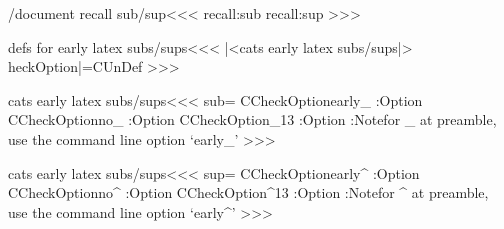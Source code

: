 {{{{{{{{\</document recall sub/sup\><<<
\csname recall:sub\endcsname   
\csname recall:sup\endcsname
>>>

\<defs for early latex subs/sups\><<<
\def\:CheckOption#1{\def\:temp{#1}%
   \:Optionfalse
   \expandafter\:ScanOptions\config:opt,,//}
\def\:ScanOptions#1,#2//{\def\:next{#1}%
   \ifx        \:next\empty
   \else \ifx  \:temp\:next   \:Optiontrue   \let\:next\relax
   \else \def\:next{\:ScanOptions#2//}%
   \fi  \fi  \:next }
|<cats early latex subs/sups|>
\let\:CheckOption|=\:UnDef
>>>



\<cats early latex subs/sups\><<<
\let\early:sub=\empty
\:CheckOption{early_} \if:Option
   \:CheckOption{no_} \if:Option  \else
      \:CheckOption{_13} \if:Option
           \def\early:sub{%
               \xdef\recall:sub{%
                  \mathcode`\noexpand\_=\the\mathcode`\_
                  \catcode`\noexpand\_=\the\catcode`\_
               }
              \mathcode`\_="8000 \catcode`\_=13 
          }
      \else
           \def\early:sub{%
               \xdef\recall:sub{%
                  \mathcode`\noexpand\_=\the\mathcode`\_
                  \catcode`\noexpand\_=\the\catcode`\_
               }%
              \mathcode`\_="8000 \catcode`\_=12 
          }
      \fi
   \fi
\else 
   \Log:Note{for \string_ at preamble, 
          use the command line option `early\string_'}%
\fi
>>>

\<cats early latex subs/sups\><<<
\let\early:sup=\empty
\:CheckOption{early^} \if:Option
   \:CheckOption{no^} \if:Option \else
      \:CheckOption{^13} \if:Option
           \def\early:sup{%
               \xdef\recall:sup{%
                  \mathcode`\noexpand\^=\the\mathcode`\^
                  \catcode`\noexpand\^=\the\catcode`\^
               }
              \mathcode`\^="8000 \catcode`\^=13 
          }
      \else
           \def\early:sup{%
               \xdef\recall:sup{%
                  \mathcode`\noexpand\^=\the\mathcode`\^
                  \catcode`\noexpand\^=\the\catcode`\^
               }%
              \mathcode`\^="8000 \catcode`\^=12
          }
      \fi
   \fi
\else 
   \Log:Note{for \string^ at preamble, 
          use the command line option `early\string^'}%
\fi
>>>







}}}}}}}}
